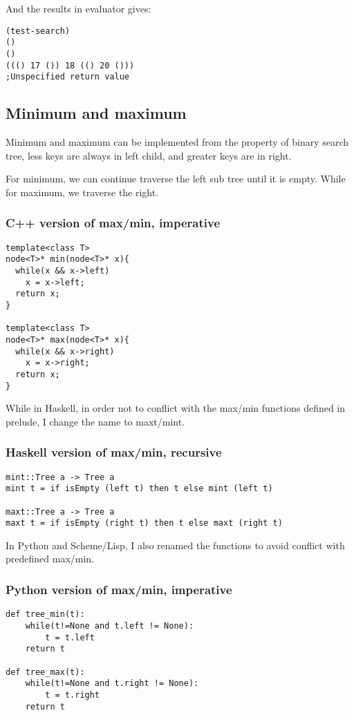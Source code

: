 \documentclass{article}
\begin{document}
And the results in evaluator gives:

\begin{verbatim}
(test-search)
()
()
((() 17 ()) 18 (() 20 ()))
;Unspecified return value
\end{verbatim}

\subsection{Minimum and maximum}

Minimum and maximum can be implemented from the property of binary search
tree, less keys are always in left child, and greater keys are in right.

For minimum, we can continue traverse the left sub tree until it is empty.
While for maximum, we traverse the right.

\subsubsection*{C++ version of max/min, imperative}

\lstset{language=c++}
\begin{lstlisting}
template<class T>
node<T>* min(node<T>* x){
  while(x && x->left)
    x = x->left;
  return x;
}

template<class T>
node<T>* max(node<T>* x){
  while(x && x->right)
    x = x->right;
  return x;
}
\end{lstlisting}

While in Haskell, in order not to conflict with the max/min functions 
defined in prelude, I change the name to maxt/mint.

\subsubsection*{Haskell version of max/min, recursive}
\lstset{language=Haskell}
\begin{lstlisting}
mint::Tree a -> Tree a
mint t = if isEmpty (left t) then t else mint (left t)

maxt::Tree a -> Tree a
maxt t = if isEmpty (right t) then t else maxt (right t)
\end{lstlisting}

In Python and Scheme/Lisp, I also renamed the functions to avoid
conflict with predefined max/min.

\subsubsection*{Python version of max/min, imperative}
\lstset{language=Python}
\begin{lstlisting}
def tree_min(t):
    while(t!=None and t.left != None):
        t = t.left
    return t

def tree_max(t):
    while(t!=None and t.right != None):
        t = t.right
    return t
\end{lstlisting}
\end{document}
